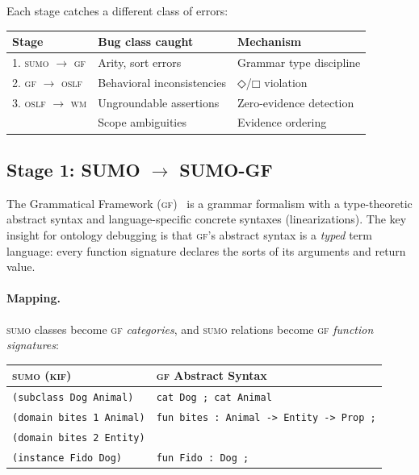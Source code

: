 \documentclass[11pt]{article}
\newcommand{\DiamondOp}{\mathbin{\Diamond}}
\newcommand{\BoxOp}{\mathbin{\Box}}
\newcommand{\KIF}{\textsc{kif}}
\newcommand{\SUMO}{\textsc{sumo}}
\newcommand{\GF}{\textsc{gf}}
\newcommand{\OSLF}{\textsc{oslf}}
\newcommand{\WM}{\textsc{wm}}
\theoremstyle{definition}
\theoremstyle{plain}
\begin{document}
Each stage catches a different class of errors:

\begin{center}
\small
\begin{tabular}{@{}lll@{}}
\toprule
\textbf{Stage} & \textbf{Bug class caught} & \textbf{Mechanism} \\
\midrule
1. \SUMO{} $\to$ \GF{} & Arity, sort errors & Grammar type discipline \\
2. \GF{} $\to$ \OSLF{} & Behavioral inconsistencies & $\DiamondOp$/$\BoxOp$ violation \\
3. \OSLF{} $\to$ \WM{} & Ungroundable assertions & Zero-evidence detection \\
& Scope ambiguities & Evidence ordering \\
\bottomrule
\end{tabular}
\end{center}

\subsection{Stage 1: SUMO $\to$ SUMO-GF}
\label{sec:stage1}

The Grammatical Framework (\GF{})~\cite{ranta2004gf} is a
grammar formalism with a type-theoretic abstract syntax and
language-specific concrete syntaxes (linearizations).
The key insight for ontology debugging is that \GF{}'s abstract
syntax is a \emph{typed} term language: every function signature
declares the sorts of its arguments and return value.

\paragraph{Mapping.}
\SUMO{} classes become \GF{} \emph{categories}, and \SUMO{} relations
become \GF{} \emph{function signatures}:

\begin{center}
\begin{tabular}{@{}ll@{}}
\toprule
\SUMO{} (\KIF{}) & \GF{} Abstract Syntax \\
\midrule
\texttt{(subclass Dog Animal)} & \texttt{cat Dog ; cat Animal} \\
\texttt{(domain bites 1 Animal)} & \texttt{fun bites : Animal -> Entity -> Prop ;} \\
\texttt{(domain bites 2 Entity)} & \\
\texttt{(instance Fido Dog)} & \texttt{fun Fido : Dog ;} \\
\bottomrule
\end{tabular}
\end{center}
\end{document}

